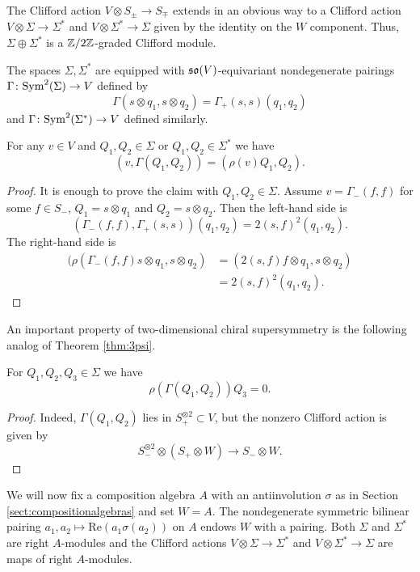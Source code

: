 \documentclass[10pt, oneside]{article}
\renewcommand{\Re}{\mathrm{Re}}
\begin{document}
The Clifford action $V\otimes S_{\pm}\rightarrow S_{\mp}$ extends in an obvious way to a Clifford action $V\otimes \Sigma\rightarrow \Sigma^*$ and $V\otimes \Sigma^*\rightarrow \Sigma$ given by the identity on the $W$ component. Thus, $\Sigma\oplus \Sigma^*$ is a $\mathbb Z/2\mathbb Z$-graded Clifford module.

The spaces $\Sigma, \Sigma^*$ are equipped with $\mathfrak{so}(V)$-equivariant nondegenerate pairings $\Gamma\colon {\rm Sym}^2(\Sigma)\rightarrow V$ defined by
\[\Gamma(s\otimes q_1, s\otimes q_2) = \Gamma_+(s, s) (q_1, q_2)\]
and $\Gamma\colon {\rm Sym}^2(\Sigma^*)\rightarrow V$ defined similarly.

\begin{prop}
For any $v\in V$ and $Q_1, Q_2\in\Sigma$ or $Q_1, Q_2\in\Sigma^*$ we have
\[(v, \Gamma(Q_1, Q_2)) = (\rho(v) Q_1, Q_2).\]
\end{prop}
\begin{proof}
It is enough to prove the claim with $Q_1, Q_2\in\Sigma$. Assume $v = \Gamma_-(f, f)$ for some $f\in S_-$, $Q_1 = s\otimes q_1$ and $Q_2 = s\otimes q_2$. Then the left-hand side is
\[(\Gamma_-(f, f), \Gamma_+(s, s)) (q_1, q_2) = 2(s, f)^2 (q_1, q_2).\]
The right-hand side is
\begin{align*}
(\rho(\Gamma_-(f, f) s\otimes q_1, s\otimes q_2) &= (2(s, f) f\otimes q_1, s\otimes q_2) \\
&= 2(s, f)^2 (q_1, q_2).
\end{align*}
\end{proof}

An important property of two-dimensional chiral supersymmetry is the following analog of Theorem \ref{thm:3psi}.

\begin{theorem}
For $Q_1, Q_2, Q_3\in\Sigma$ we have
\[\rho(\Gamma(Q_1, Q_2))Q_3 = 0.\]
\label{thm:2d3psi}
\end{theorem}
\begin{proof}
Indeed, $\Gamma(Q_1, Q_2)$ lies in $S_+^{\otimes 2}\subset V$, but the nonzero Clifford action is given by
\[S_-^{\otimes 2}\otimes (S_+\otimes W)\longrightarrow S_-\otimes W.\]
\end{proof}

We will now fix a composition algebra $A$ with an antiinvolution $\sigma$ as in Section \ref{sect:compositionalgebras} and set $W = A$. The nondegenerate symmetric bilinear pairing $a_1, a_2\mapsto \Re(a_1\sigma(a_2))$ on $A$ endows $W$ with a pairing. Both $\Sigma$ and $\Sigma^*$ are right $A$-modules and the Clifford actions $V\otimes \Sigma\rightarrow \Sigma^*$ and $V\otimes \Sigma^*\rightarrow \Sigma$ are maps of right $A$-modules.
\end{document}
